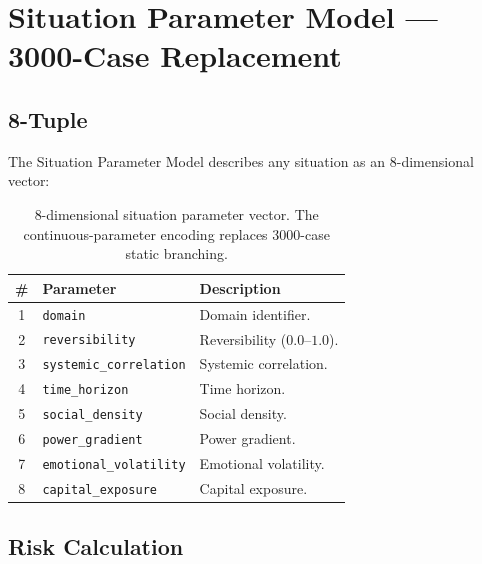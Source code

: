 
\chapter{Situation Parameter Model --- 3000-Case Replacement}
\label{ch:situation-parameter-model}

\section{8-Tuple}
\label{sec:situation-8-tuple}

The Situation Parameter Model describes any situation as an
8-dimensional vector:

\begin{table}[ht]
\centering
\small
\begin{tabularx}{\linewidth}{clX}
\toprule
\textbf{\#} & \textbf{Parameter} & \textbf{Description} \\
\midrule
1 & \texttt{domain} & Domain identifier. \\
2 & \texttt{reversibility} & Reversibility ($0.0$--$1.0$). \\
3 & \texttt{systemic\_correlation} & Systemic correlation. \\
4 & \texttt{time\_horizon} & Time horizon. \\
5 & \texttt{social\_density} & Social density. \\
6 & \texttt{power\_gradient} & Power gradient. \\
7 & \texttt{emotional\_volatility} & Emotional volatility. \\
8 & \texttt{capital\_exposure} & Capital exposure. \\
\bottomrule
\end{tabularx}
\caption[Situation 8-tuple]{8-dimensional situation parameter vector.
The continuous-parameter encoding replaces 3000-case static
branching.}
\label{tab:situation-8-tuple}
\end{table}

\section{Risk Calculation}
\label{sec:situation-risk}

